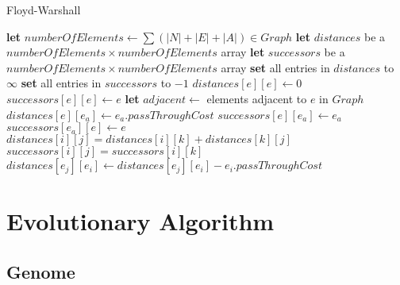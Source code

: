 \begin{algorithm}
\caption{Floyd-Warshall}\label{floyd-warshall}
\begin{algorithmic}[1]

	\State \textbf{let} $numberOfElements \leftarrow \sum (|N|+|E|+|A|) \in Graph$
	\State \textbf{let} $distances$ be a $numberOfElements \times numberOfElements$ array
	\State \textbf{let} $successors$ be a $numberOfElements \times numberOfElements$ array
	\State \textbf{set} all entries in $distances$ to $\infty$
	\State \textbf{set} all entries in $successors$ to $-1$
		\State $distances[e][e] \leftarrow 0$
		\State $successors[e][e] \leftarrow e$
	\EndFor
		\State \textbf{let} $adjacent \leftarrow $ elements adjacent to $e$ in $Graph$
			\State $distances[e][e_a] \leftarrow e_a.passThroughCost$
			\State $successors[e][e_a] \leftarrow e_a$
			\State $successors[e_a][e] \leftarrow e$
		\EndFor
	\EndFor
					\State $distances[i][j] = distances[i][k] + distances[k][j]$
					\State $successors[i][j] = successors[i][k]$
				\EndIf
			\EndFor
		\EndFor
	\EndFor
			\State $distances[e_j][e_i] \leftarrow distances[e_j][e_i] - e_i.passThroughCost$
		\EndIf
	\EndFor
\EndProcedure

\end{algorithmic}
\end{algorithm}


\section{Evolutionary Algorithm} %
\label{sec:evolutionary_algorithm}

\subsection{Genome} %
\label{sub:genome}



